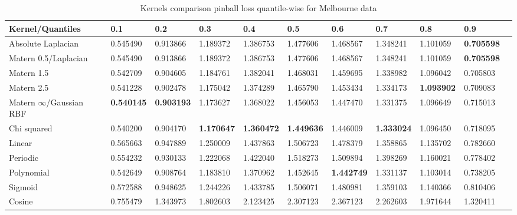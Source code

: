 \begin{table}[!htp]
    \caption{Kernels comparison pinball loss quantile-wise for Melbourne data}
    \label{tab:kernel pinball comparison quantile-wise}
    \begin{adjustbox}{width=\textwidth}
    \begin{tabular}{lllllllllll}
    \toprule
    Kernel/Quantiles & 0.1 & 0.2 & 0.3 & 0.4 & 0.5 & 0.6 & 0.7 & 0.8 & 0.9 \\
    \midrule
    Absolute Laplacian & 0.545490 &
    0.913866 &
    1.189372 &
    1.386753 &
    1.477606 &
    1.468567 &
    1.348241 &
    1.101059 &
    \textbf{0.705598} &
    \\
    Matern 0.5/Laplacian & 0.545490 &
    0.913866 &
    1.189372 &
    1.386753 &
    1.477606 &
    1.468567 &
    1.348241 &
    1.101059 &
    \textbf{0.705598} &
\\
    Matern 1.5 & 0.542709 &
    0.904605 &
    1.184761 &
    1.382041 &
    1.468031 &
    1.459695 &
    1.338982 &
    1.096042 &
    0.705803 &
  \\  
    Matern 2.5 & 0.541228 &
    0.902478 &
    1.175042 &
    1.374289 &
    1.465790 &
    1.453434 &
    1.334173 &
    \textbf{1.093902} &
    0.709083 &
    \\
    Matern $\infty$/Gaussian RBF & \textbf{0.540145} &
    \textbf{0.903193} &
    1.173627 &
    1.368022 &
    1.456053 &
    1.447470 &
    1.331375 &
    1.096649 &
    0.715013 &    
    \\
    Chi squared & 0.540200 &
    0.904170 &
    \textbf{1.170647} &
    \textbf{1.360472} &
    \textbf{1.449636} &
    1.446009 &
    \textbf{1.333024} &
    1.096450 &
    0.718095 &
    \\
    Linear & 0.565663 &
    0.947889 &
    1.250009 &
    1.437863 &
    1.506723 &
    1.478379 &
    1.358865 &
    1.135702 &
    0.782660 &
    \\
    Periodic & 0.554232 &
    0.930133 &
    1.222068 &
    1.422040 &
    1.518273 &
    1.509894 &
    1.398269 &
    1.160021 &
    0.778402 &
    \\
    Polynomial & 0.542649 &
    0.908764 &
    1.183810 &
    1.370962 &
    1.452645 &
    \textbf{1.442749} &
    1.331137 &
    1.103014 &
    0.738205 &
    \\
    Sigmoid & 0.572588 &
    0.948625 &
    1.244226 &
    1.433785 &
    1.506071 &
    1.480981 &
    1.359103 &
    1.140366 &
    0.810406 &
    \\
    Cosine & 0.755479 &
    1.343973 &
    1.802603 &
    2.123425 &
    2.307123 &
    2.367123 &
    2.262603 &
    1.971644 &
    1.320411 \\
    \bottomrule
    \end{tabular}
    \end{adjustbox}
\end{table}


